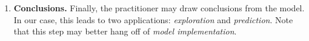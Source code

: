\begin{enumerate}
  
  \item \textbf{Conclusions.} Finally, the practitioner may draw
    conclusions from the model.  In our case, this leads to two
    applications: \emph{exploration} and \emph{prediction}.  Note that
    this step may better hang off of \emph{model implementation}.




\end{enumerate}

